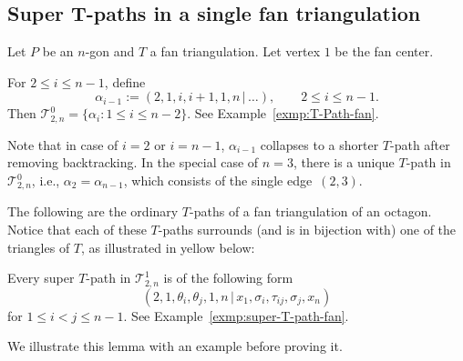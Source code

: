 \subsection[Super T-paths in a single fan triangulation]{Super $\boldsymbol{T}$-paths in a single fan triangulation}

Let $P$ be an $n$-gon and $T$ a fan triangulation. Let vertex $1$ be the fan center.

\begin{Lemma}[Schiffler] \label{lemma:Schiffler}
	For $2\leq i\leq n-1$, define
	\[\alpha_{i-1}:=(2,1,i,i+1,1,n\,|\,\dots),\qquad2\leqslant i\leqslant n-1.\]
	Then $\mathcal T^0_{2,n}=\{\alpha_i\colon 1\leq i\leq n-2\}$. See Example~{\rm \ref{exmp:T-Path-fan}}.
	
	Note that in case of $i=2$ or $i=n-1$, $\alpha_{i-1}$ collapses to a shorter $T$-path after removing backtracking. In the special case of $n=3$, there is a unique $T$-path in $\mathcal T^0_{2,n}$, i.e., $\alpha_2 = \alpha_{n-1}$, which consists of the single edge~$(2,3)$.
\end{Lemma}

\begin{Example}\label{exmp:T-Path-fan}\rm
	The following are the ordinary $T$-paths of a fan triangulation of an octagon. Notice that each of these $T$-paths surrounds (and is in bijection with) one of the triangles of $T$, as illustrated in yellow below:
\begin{center}

\end{center}
\end{Example}

\begin{Lemma}\label{lm:super-path-single-fan}
	Every super $T$-path in $\mathcal T^1_{2,n}$ is of the following form
	\[(2,1,\theta_i,\theta_j,1,n\,|\,x_1,\sigma_i,\tau_{ij},\sigma_j,x_n)\]
	for $1\leq i<j\leq n-1$. See Example~{\rm \ref{exmp:super-T-path-fan}}.
\end{Lemma}

We illustrate this lemma with an example before proving it.

